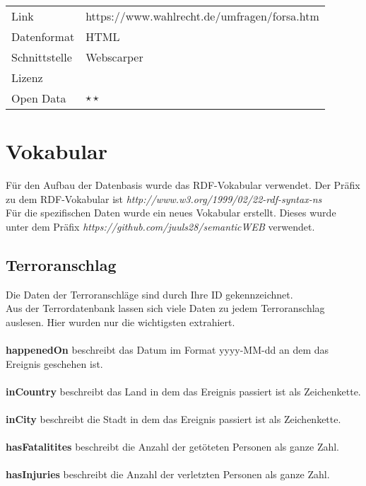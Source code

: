 \documentclass[a4paper,10pt,parskip]{article}
\begin{document}
\vspace{0.5cm}
\begin{tabular}{l|p{9cm}}
	Link & https://www.wahlrecht.de/umfragen/forsa.htm \\
 	Datenformat & HTML \\
 	Schnittstelle & Webscarper \\
 	Lizenz &  \\
 	Open Data & $\star\star$ \\
\end{tabular}

\section{Vokabular}
Für den Aufbau der Datenbasis wurde das RDF-Vokabular verwendet. Der Präfix zu dem RDF-Vokabular ist \textit{http://www.w3.org/1999/02/22-rdf-syntax-ns}\\

Für die spezifischen Daten wurde ein neues Vokabular erstellt. Dieses wurde unter dem Präfix \textit{https://github.com/juuls28/semanticWEB} verwendet.\\ 
\subsection{Terroranschlag}
Die Daten der Terroranschläge sind durch Ihre ID gekennzeichnet.\\
Aus der Terrordatenbank lassen sich viele Daten zu jedem Terroranschlag auslesen. Hier wurden nur die wichtigsten extrahiert.\\
\\
\textbf{happenedOn} beschreibt das Datum im Format yyyy-MM-dd an dem das Ereignis geschehen ist.\\
\\
\textbf{inCountry} beschreibt das Land in dem das Ereignis passiert ist als Zeichenkette.\\
\\
\textbf{inCity} beschreibt die Stadt in dem das Ereignis passiert ist als Zeichenkette.\\
\\
\textbf{hasFatalitites} beschreibt die Anzahl der getöteten Personen als ganze Zahl.\\
\\
\textbf{hasInjuries} beschreibt die Anzahl der verletzten Personen als ganze Zahl.\\
\\
\end{document}
